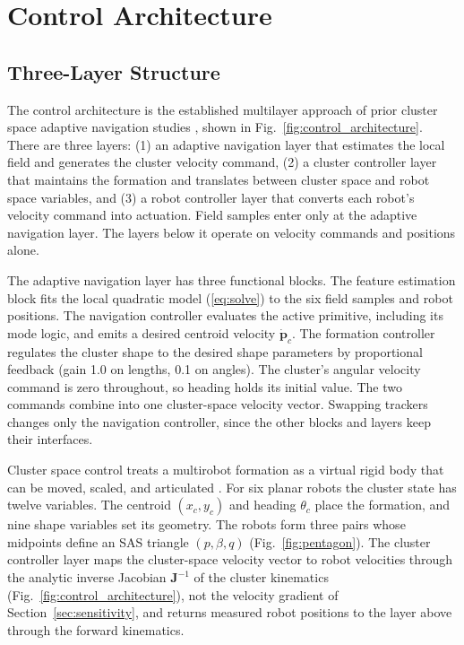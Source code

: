 \documentclass[lettersize,journal]{IEEEtran}
\begin{document}
\section{Control Architecture}
\label{sec:controllers}

\subsection{Three-Layer Structure}
\label{sec:arch}

The control architecture is the established multilayer approach of prior
cluster space adaptive navigation studies \cite{2,10}, shown in
Fig.~\ref{fig:control_architecture}. There are three layers: (1) an
adaptive navigation layer that estimates the local field and generates the
cluster velocity command, (2) a cluster controller layer that maintains
the formation and translates between cluster space and robot space
variables, and (3) a robot controller layer that converts each robot's
velocity command into actuation. Field samples enter only at the adaptive
navigation layer. The layers below it operate on velocity commands and
positions alone.

The adaptive navigation layer has three functional blocks. The feature
estimation block fits the local quadratic model (\ref{eq:solve}) to the
six field samples and robot positions. The navigation controller evaluates
the active primitive, including its mode logic, and emits a desired
centroid velocity $\dot{\mathbf{p}}_c$.  The formation controller regulates the cluster
shape to the desired shape parameters by proportional feedback (gain 1.0 on
lengths, 0.1 on angles). The cluster's angular velocity command is zero
throughout, so heading holds its initial value. The two
commands combine into one cluster-space velocity vector. Swapping
trackers changes only the navigation controller, since the other blocks and
layers keep their interfaces.

Cluster space control treats a multirobot formation as a virtual rigid
body that can be moved, scaled, and articulated \cite{30}. For six planar
robots the cluster state has twelve variables. The centroid $(x_c, y_c)$
and heading $\theta_c$ place the formation, and nine shape variables set
its geometry. The robots form three pairs whose midpoints define an SAS
triangle $(p, \beta, q)$ (Fig.~\ref{fig:pentagon}). The cluster controller layer maps the
cluster-space velocity vector to robot velocities through the analytic
inverse Jacobian $\mathbf{J}^{-1}$ of the cluster kinematics
(Fig.~\ref{fig:control_architecture}), not the velocity gradient of
Section~\ref{sec:sensitivity}, and returns measured robot positions to
the layer above through the forward kinematics.
\end{document}
